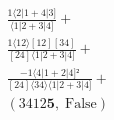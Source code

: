 \documentclass[varwidth, border=5pt]{standalone}
\begin{document}
\begin{my}
$\begin{gathered}
\scriptscriptstyle\frac{1⟨2|1+4|3]}{⟨1|2+3|4]} +\\
\scriptscriptstyle\frac{1⟨12⟩[12][34]}{[24]⟨1|2+3|4]} +\\
\scriptscriptstyle\frac{-1⟨4|1+2|4]²}{[24]⟨34⟩⟨1|2+3|4]} +\\
\scriptscriptstyle(3412𝟓,\;\text{False}) \phantom{+}
\end{gathered}$
\end{my}
\end{document}
